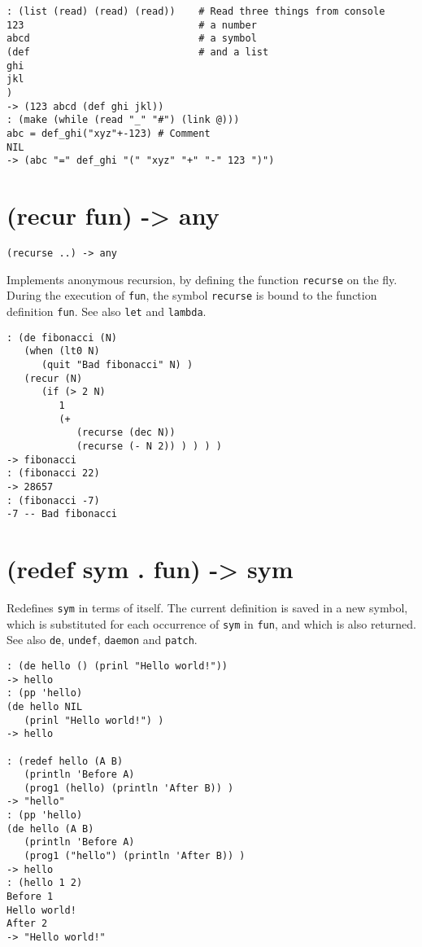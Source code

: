 {{{{{{{{\begin{verbatim}
: (list (read) (read) (read))    # Read three things from console
123                              # a number
abcd                             # a symbol
(def                             # and a list
ghi
jkl
)
-> (123 abcd (def ghi jkl))
: (make (while (read "_" "#") (link @)))
abc = def_ghi("xyz"+-123) # Comment
NIL
-> (abc "=" def_ghi "(" "xyz" "+" "-" 123 ")")
\end{verbatim}

 
\section{(recur fun) -> any}
\label{sec-8-1-18-13}


\texttt{(recurse ..) -> any}

Implements anonymous recursion, by defining the function \texttt{recurse} on
the fly. During the execution of \texttt{fun}, the symbol \texttt{recurse} is bound to
the function definition \texttt{fun}. See also \texttt{let} and \texttt{lambda}.


\begin{verbatim}
: (de fibonacci (N)
   (when (lt0 N)
      (quit "Bad fibonacci" N) )
   (recur (N)
      (if (> 2 N)
         1
         (+
            (recurse (dec N))
            (recurse (- N 2)) ) ) ) )
-> fibonacci
: (fibonacci 22)
-> 28657
: (fibonacci -7)
-7 -- Bad fibonacci
\end{verbatim}

 
\section{(redef sym . fun) -> sym}
\label{sec-8-1-18-14}


Redefines \texttt{sym} in terms of itself. The current definition is saved in a
new symbol, which is substituted for each occurrence of \texttt{sym} in \texttt{fun},
and which is also returned. See also \texttt{de}, \texttt{undef}, \texttt{daemon} and
\texttt{patch}.


\begin{verbatim}
: (de hello () (prinl "Hello world!"))
-> hello
: (pp 'hello)
(de hello NIL
   (prinl "Hello world!") )
-> hello

: (redef hello (A B)
   (println 'Before A)
   (prog1 (hello) (println 'After B)) )
-> "hello"
: (pp 'hello)
(de hello (A B)
   (println 'Before A)
   (prog1 ("hello") (println 'After B)) )
-> hello
: (hello 1 2)
Before 1
Hello world!
After 2
-> "Hello world!"


\end{verbatim}}}}}}}}}
